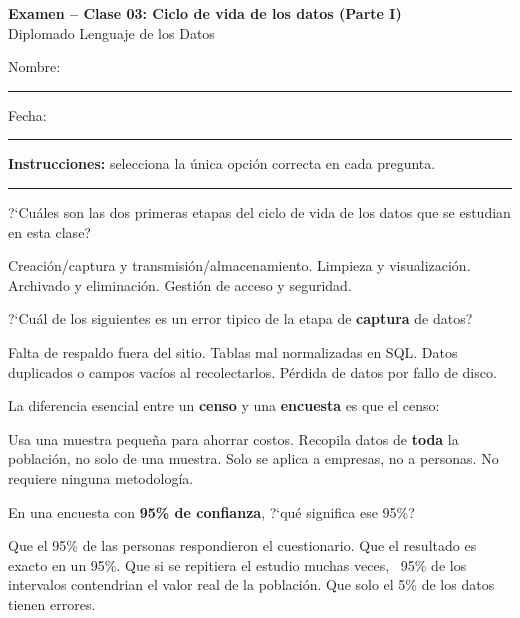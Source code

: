 \documentclass[12pt,addpoints]{exam}
\begin{document}
\begin{center}
  {\color{molMorado}\Large\bfseries Examen -- Clase 03:
   Ciclo de vida de los datos (Parte I)}\\[3pt]
  {\color{molTeal}\large Diplomado Lenguaje de los Datos}
\end{center}

\vspace{6pt}
\noindent Nombre: \rule{6cm}{0.4pt} \hfill Fecha: \rule{3cm}{0.4pt}

\vspace{6pt}
\noindent\textbf{Instrucciones:} selecciona la \'unica opci\'on correcta en cada
pregunta.

\vspace{4pt}
\hrule
\vspace{8pt}

\begin{questions}

\question[1] ?`Cu\'ales son las dos primeras etapas del ciclo de vida de los
datos que se estudian en esta clase?
\begin{choices}
  \CorrectChoice Creaci\'on/captura y transmisi\'on/almacenamiento.
  \choice Limpieza y visualizaci\'on.
  \choice Archivado y eliminaci\'on.
  \choice Gesti\'on de acceso y seguridad.
\end{choices}

\question[1] ?`Cu\'al de los siguientes es un error tipico de la etapa de
\textbf{captura} de datos?
\begin{choices}
  \choice Falta de respaldo fuera del sitio.
  \choice Tablas mal normalizadas en SQL.
  \CorrectChoice Datos duplicados o campos vac\'ios al recolectarlos.
  \choice P\'erdida de datos por fallo de disco.
\end{choices}

\question[1] La diferencia esencial entre un \textbf{censo} y una \textbf{encuesta}
es que el censo:
\begin{choices}
  \choice Usa una muestra peque\~na para ahorrar costos.
  \CorrectChoice Recopila datos de \textbf{toda} la poblaci\'on, no solo de una
    muestra.
  \choice Solo se aplica a empresas, no a personas.
  \choice No requiere ninguna metodolog\'ia.
\end{choices}

\question[1] En una encuesta con \textbf{95\% de confianza}, ?`qu\'e significa
ese 95\%?
\begin{choices}
  \choice Que el 95\% de las personas respondieron el cuestionario.
  \choice Que el resultado es exacto en un 95\%.
  \CorrectChoice Que si se repitiera el estudio muchas veces, ~95\% de los
    intervalos contendrian el valor real de la poblaci\'on.
  \choice Que solo el 5\% de los datos tienen errores.
\end{choices}


\end{questions}
\end{document}
